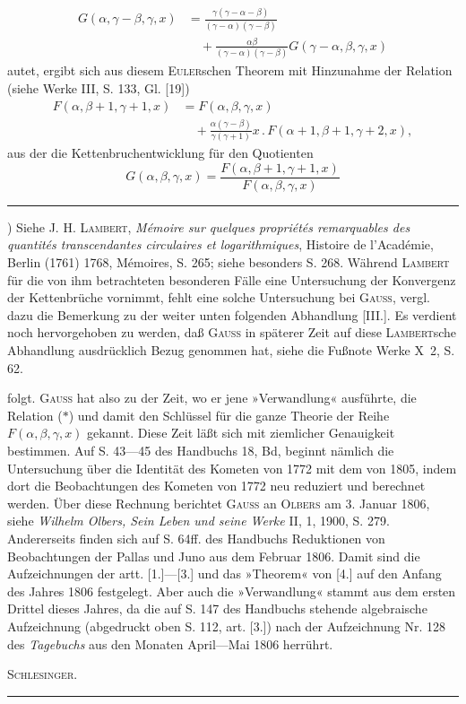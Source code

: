 \[\begin{aligned}
G(\alpha,\gamma-\beta,\gamma,x)&=\frac{\gamma(\gamma-\alpha-\beta)}{(\gamma-\alpha)(\gamma-\beta)}\\[.6em]
&\quad+\frac{\alpha\beta}{(\gamma-\alpha)(\gamma-\beta)}G(\gamma-\alpha,\beta,\gamma,x)
\end{aligned}\]
\noindent autet, ergibt sich aus diesem \textsc{Euler}schen Theorem mit Hinzunahme der Relation (siehe Werke III, S. 133, Gl. [19])
\begin{equation}
\begin{aligned}
F(\alpha,\beta+1,\gamma+1,x)&=F(\alpha,\beta,\gamma,x)\\[.6em]
&\quad+\frac{\alpha(\gamma-\beta)}{\gamma(\gamma+1)}x\,{.}\,F(\alpha+1,\beta+1,\gamma+2,x),
\end{aligned}\tag*{($\ast$)}
\end{equation}
\noindent aus der die Kettenbruchentwicklung für den Quotienten
\[G(\alpha,\beta,\gamma,x)=\frac{F(\alpha,\beta+1,\gamma+1,x)}{F(\alpha,\beta,\gamma,x)}\]
\par{}\bigskip\noindent\rule{.25\linewidth}{.4pt}\par\smallskip
{\small\par\indent *) Siehe J. H. \textsc{Lambert}, \textit{Mémoire sur quelques propriétés remarquables des quantités transcendantes circulaires et logarithmiques}, Histoire de l’Académie, Berlin (1761) 1768, Mémoires, S. 265; siehe besonders S. 268. Während \textsc{Lambert} für die von ihm betrachteten besonderen Fälle eine Untersuchung der Konvergenz der Kettenbrüche vornimmt, fehlt eine solche Untersuchung bei \textsc{Gauss}, vergl. dazu die Bemerkung zu der weiter unten folgenden Abhandlung [III.]. Es verdient noch hervorgehoben zu werden, daß \textsc{Gauss} in späterer Zeit auf diese \textsc{Lambert}sche Abhandlung ausdrücklich Bezug genommen hat, siehe die Fußnote Werke X~2, S. 62.\par}
\clearpage{}
\noindent folgt. \textsc{Gauss} hat also zu der Zeit, wo er jene »Verwandlung« ausführte, die Relation ($\ast$) und damit den Schlüssel für die ganze Theorie der Reihe $F(\alpha,\beta,\gamma,x)$ gekannt. Diese Zeit läßt sich mit ziemlicher Genauigkeit bestimmen. Auf S. 43---45 des Handbuchs 18, Bd, beginnt nämlich die Untersuchung über die Identität des Kometen von 1772 mit dem von 1805, indem dort die Beobachtungen des Kometen von 1772 neu reduziert und berechnet werden. Über diese Rechnung berichtet \textsc{Gauss} an \textsc{Olbers} am 3. Januar 1806, siehe \textit{Wilhelm Olbers, Sein Leben und seine Werke} II, 1, 1900, S. 279. Andererseits finden sich auf S. 64ff. des Handbuchs Reduktionen von Beobachtungen der Pallas und Juno aus dem Februar 1806. Damit sind die Aufzeichnungen der artt. [1.]---[3.] und das »Theorem« von [4.] auf den Anfang des Jahres 1806 festgelegt. Aber auch die »Verwandlung« stammt aus dem ersten Drittel dieses Jahres, da die auf S. 147 des Handbuchs stehende algebraische Aufzeichnung (abgedruckt oben S. 112, art. [3.]) nach der Aufzeichnung Nr. 128 des \textit{Tagebuchs} aus den Monaten April---Mai 1806 herrührt.
\begin{flushright}\textsc{Schlesinger.}\end{flushright}
\par\bigskip\begin{center}\rule{.25\linewidth}{.4pt}\end{center}
\clearpage
\endgroup
